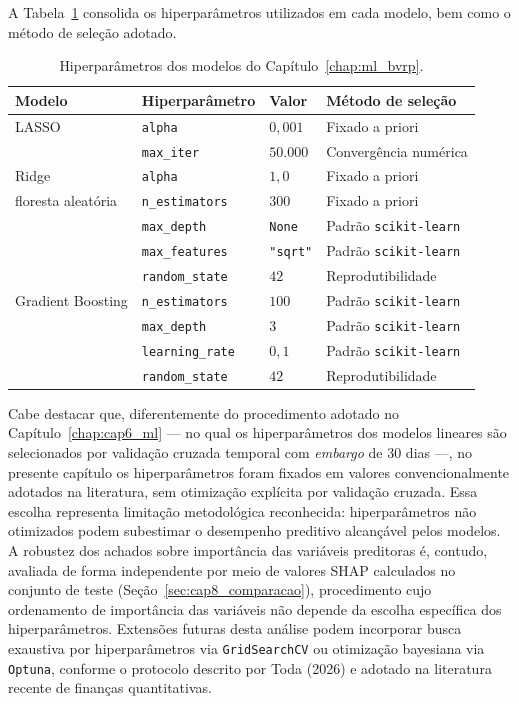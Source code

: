 A Tabela~\ref{tab:cap8-hiperparametros} consolida os hiperparâmetros utilizados em cada modelo, bem como o método de seleção adotado.
\begin{table}[H]
\centering
\caption{Hiperparâmetros dos modelos do Capítulo~\ref{chap:ml_bvrp}.}
\label{tab:cap8-hiperparametros}
\small
\begin{tabular}{llll}
\toprule
\textbf{Modelo} & \textbf{Hiperparâmetro} & \textbf{Valor} & \textbf{Método de seleção} \\
\midrule
LASSO         & \texttt{alpha}        & $0{,}001$ & Fixado a priori \\
              & \texttt{max\_iter}    & $50.000$  & Convergência numérica \\
\midrule
Ridge         & \texttt{alpha}        & $1{,}0$   & Fixado a priori \\
\midrule
floresta aleatória & \texttt{n\_estimators} & $300$    & Fixado a priori \\
              & \texttt{max\_depth}    & \texttt{None} & Padrão \texttt{scikit-learn} \\
              & \texttt{max\_features} & \texttt{"sqrt"} & Padrão \texttt{scikit-learn} \\
              & \texttt{random\_state} & $42$    & Reprodutibilidade \\
\midrule
Gradient Boosting & \texttt{n\_estimators}  & $100$   & Padrão \texttt{scikit-learn} \\
              & \texttt{max\_depth}      & $3$     & Padrão \texttt{scikit-learn} \\
              & \texttt{learning\_rate}  & $0{,}1$ & Padrão \texttt{scikit-learn} \\
              & \texttt{random\_state}   & $42$    & Reprodutibilidade \\
\bottomrule
\end{tabular}
\end{table}
Cabe destacar que, diferentemente do procedimento adotado no Capítulo~\ref{chap:cap6_ml} --- no qual os hiperparâmetros dos modelos lineares são selecionados por validação cruzada temporal com \textit{embargo} de 30 dias ---, no presente capítulo os hiperparâmetros foram fixados em valores convencionalmente adotados na literatura, sem otimização explícita por validação cruzada. Essa escolha representa limitação metodológica reconhecida: hiperparâmetros não otimizados podem subestimar o desempenho preditivo alcançável pelos modelos. A robustez dos achados sobre importância das variáveis preditoras é, contudo, avaliada de forma independente por meio de valores SHAP calculados no conjunto de teste (Seção~\ref{sec:cap8_comparacao}), procedimento cujo ordenamento de importância das variáveis não depende da escolha específica dos hiperparâmetros. Extensões futuras desta análise podem incorporar busca exaustiva por hiperparâmetros via \texttt{GridSearchCV} ou otimização bayesiana via \texttt{Optuna}, conforme o protocolo descrito por Toda (2026) e adotado na literatura recente de finanças quantitativas.

